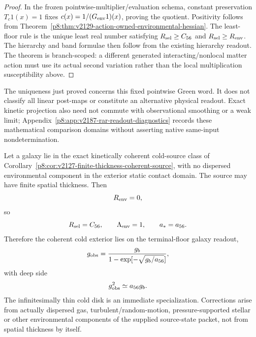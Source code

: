 \documentclass[12pt,a4paper]{article}
\begin{document}
\begin{proof}
In the frozen pointwise-multiplier/evaluation schema, constant preservation
$T_c1(x)=1$ fixes
$c(x)=1/(G_{\rm env}1)(x)$, proving the quotient.  Positivity follows from
Theorem~\ref{p8:thm:v2129-action-owned-environmental-hessian}.  The least-floor
rule is the unique least real number satisfying
$R_{\rm sel}\ge C_{56}$ and $R_{\rm sel}\ge R_{\rm env}$.  The hierarchy and
band formulae then follow from the existing hierarchy readout.  The theorem is
branch-scoped: a different generated interacting/nonlocal matter action must
use its actual second variation rather than the local multiplication
susceptibility above.
\end{proof}
The uniqueness just proved concerns this fixed pointwise Green word.  It does
not classify all linear post-maps or constitute an alternative physical
readout.  Exact kinetic projection also need not commute with observational
smoothing or a weak limit; Appendix~\ref{p8:app:v2187-rar-readout-diagnostics}
records these mathematical comparison domains without asserting native
same-input nondetermination.


\begin{corollary}
\label{p8:cor:cold-thin-disk-terminal-floor}
Let a galaxy lie in the exact kinetically coherent cold-source class of
Corollary~\ref{p8:cor:v2127-finite-thickness-coherent-source}, with no
dispersed environmental component in the exterior static contact domain.
The source may have finite spatial thickness.  Then
\begin{equation}
\label{p8:eq:cold-disk-Renv-zero}
 R_{\rm env}=0,
\end{equation}
so
\begin{equation}
\label{p8:eq:cold-disk-terminal-floor}
 R_{\rm sel}=C_{56},
 \qquad
 \Lambda_{\rm env}=1,
 \qquad
 a_*=a_{56}.
\end{equation}
Therefore the coherent cold exterior lies on the terminal-floor galaxy
readout,
\begin{equation}
\label{p8:eq:cold-disk-terminal-reeb-response}
 g_{\rm obs}=\frac{g_b}{1-\exp[-\sqrt{g_b/a_{56}}]},
\end{equation}
with deep side
\begin{equation}
\label{p8:eq:cold-disk-terminal-deep-side}
 g_{\rm obs}^2\simeq a_{56}g_b.
\end{equation}
The infinitesimally thin cold disk is an immediate specialization.  Corrections
arise from actually dispersed gas, turbulent/random-motion, pressure-supported
stellar or other environmental components of the supplied source-state packet,
not from spatial thickness by itself.
\end{corollary}
\end{document}
